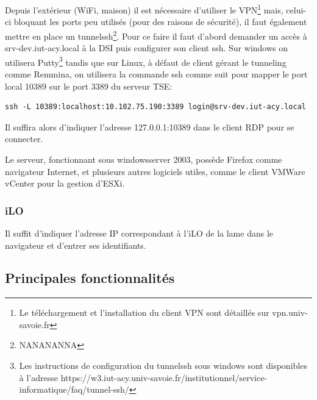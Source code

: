 \documentclass[a4paper,oneside]{report}
\begin{document}
Depuis l'extérieur (WiFi, maison) il est nécessaire d'utiliser le VPN\footnote{Le téléchargement et l'installation du client VPN sont détaillés sur vpn.univ-savoie.fr} mais, celui-ci bloquant les ports peu utilisés (pour des raisons de sécurité), il faut également mettre en place un \gls{tunnelssh}\footnote{NANANANNA}.
Pour ce faire il faut d'abord demander un accès à srv-dev.iut-acy.local à la DSI puis configurer son client \gls{ssh}.\newline
Sur \gls{windows} on utilisera Putty\footnote{Les instructions de configuration du \gls{tunnelssh} sous \gls{windows} sont disponibles à l'adresse https://w3.iut-acy.univ-savoie.fr/institutionnel/service-informatique/faq/tunnel-ssh/} tandis que sur Linux, à défaut de client gérant le tunneling comme Remmina, on utilisera la commande ssh comme suit pour mapper le port local 10389 sur le port 3389 du serveur TSE:
\label{tunnelingSsh}
\begin{verbatim}
ssh -L 10389:localhost:10.102.75.190:3389 login@srv-dev.iut-acy.local
\end{verbatim}
Il suffira alors d'indiquer l'adresse 127.0.0.1:10389 dans le client RDP pour se connecter.

Le serveur, fonctionnant sous \gls{windowsserver} 2003, possède Firefox comme navigateur Internet, et plusieurs autres logiciels utiles, comme le client VMWare vCenter pour la gestion d'ESXi.

\subsubsection{iLO}
Il suffit d'indiquer l'adresse IP correspondant à l'iLO de la lame dans le navigateur et d'entrer ses identifiants.
\newpage

\subsection{Principales fonctionnalités}
\end{document}
